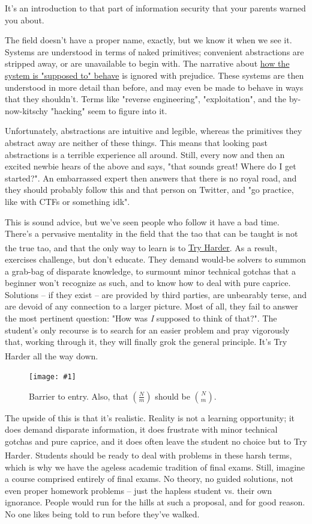 \documentclass{article}
\newcommand{\wrapimageleftcap}[2] {\begin{figure}\begin{center}\texttt{[image: \#1]}\end{center}\caption{#2}\end{figure}
}
\begin{document}
It's an introduction to that part of information security that your parents warned you about.

The field doesn't have a proper name, exactly, but we know it when we see it. Systems are understood in terms of naked primitives; convenient abstractions are stripped away, or are unavailable to begin with. The narrative about \href{https://en.wikipedia.org/wiki/functional_fixedness}{how the system is "supposed to" behave} is ignored with prejudice. These systems are then understood in more detail than before, and may even be made to behave in ways that they shouldn't. Terms like "reverse engineering", "exploitation", and the by-now-kitschy "hacking" seem to figure into it. 

Unfortunately, abstractions are intuitive and legible, whereas the primitives they abstract away are neither of these things. This means that looking past abstractions is a terrible experience all around.  Still, every now and then an excited newbie hears of the above and says, "that sounds great! Where do I get started?". An embarrassed expert then answers that there is no royal road, and they should probably follow this and that person on Twitter, and "go practice, like with CTFs or something idk".

This is sound advice, but we've seen people who follow it have a bad time. There's a pervasive mentality in the field that the tao that can be taught is not the true tao, and that the only way to learn is to \href{https://www.offensive-security.com/offsec/say-try-harder/}{Try Harder\textsuperscript{\textregistered}}. As a result, exercises challenge, but don't educate. They demand would-be solvers to summon a grab-bag of disparate knowledge, to surmount minor technical gotchas that a beginner won't recognize as such, and to know how to deal with pure caprice. Solutions -- if they exist -- are provided by third parties, are unbearably terse, and are devoid of any connection to a larger picture. Most of all, they fail to answer the most pertinent question: "How was \textit{I} supposed to think of that?". The student's only recourse is to search for an easier problem and pray vigorously that, working through it, they will finally grok the general principle. It's Try Harder\textsuperscript{\textregistered} all the way down.

\wrapimageleftcap{./images/complications.png}{Barrier to entry. Also, that $\left(\frac{N}{m}\right)$ should be ${N \choose m}$.}

The upside of this is that it's realistic. Reality is not a learning opportunity; it does demand disparate information, it does frustrate with minor technical gotchas and pure caprice, and it does often leave the student no choice but to Try Harder\textsuperscript{\textregistered}. Students should be ready to deal with problems in these harsh terms, which is why we have the ageless academic tradition of final exams. Still, imagine a course comprised entirely of final exams. No theory, no guided solutions, not even proper homework problems -- just the hapless student vs. their own ignorance. People would run for the hills at such a proposal, and for good reason. No one likes being told to run before they've walked.
\end{document}
